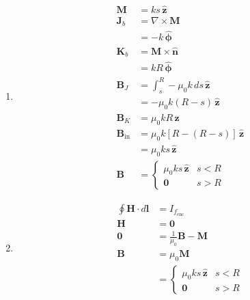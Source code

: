 \documentclass{article}
\renewcommand{\vec}[1]{\boldsymbol{\mathbf{#1}}}
\newcommand{\uvec}[1]{\hat{\vec{#1}}}
\begin{document}
\setcounter{subsection}{11}
\subsection{}

\begin{enumerate}
  \item

        \begin{align*}
          \vec{M}           & = k s \,\uvec{z}                     \\
          \vec{J}_b         & = \nabla \times \vec{M}              \\
                            & = -k \,\uvec{\phi}                   \\
          \vec{K}_b         & = \vec{M} \times \uvec{n}            \\
                            & = k R \,\uvec{\phi}                  \\
          \vec{B}_J         & = \int_s^R -\mu_0 k \,d s \,\uvec{z} \\
                            & = -\mu_0 k (R - s) \,\uvec{z}        \\
          \vec{B}_K         & = \mu_0 k R \,\uvec{z}               \\
          \vec{B}_\text{in} & = \mu_0 k [R - (R - s)] \,\uvec{z}   \\
                            & = \mu_0 k s \,\uvec{z}               \\
          \vec{B}           & = \begin{cases}
                                  \mu_0 k s \,\uvec{z} & s < R \\
                                  \vec{0}              & s > R
                                \end{cases}
        \end{align*}

  \item

        \begin{align*}
          \oint \vec{H} \cdot d \vec{l} & = I_{f_\text{enc}}                  \\
          \vec{H}                       & = \vec{0}                           \\
          \vec{0}                       & = \frac{1}{\mu_0} \vec{B} - \vec{M} \\
          \vec{B}                       & = \mu_0 \vec{M}                     \\
                                        & = \begin{cases}
                                              \mu_0 k s \,\uvec{z} & s < R \\
                                              \vec{0}              & s > R
                                            \end{cases}
        \end{align*}
\end{enumerate}
\end{document}
